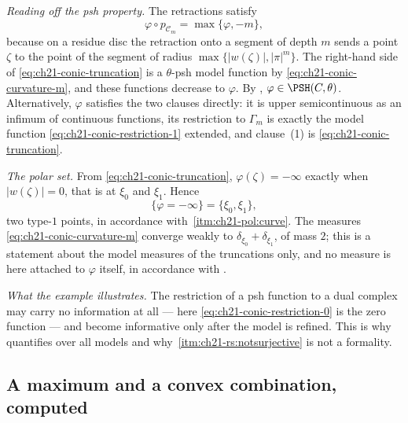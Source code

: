 \begin{example}
\emph{Reading off the psh property.}  The retractions satisfy
\begin{equation}
\label{eq:ch21-conic-truncation}
 \varphi\circ p_{\mathcal C_m}=\max\{\varphi,-m\},
\end{equation}
because on a residue disc the retraction onto a segment of depth \(m\) sends
a point \(\zeta\) to the point of the segment of radius
\(\max\{|w(\zeta)|,|\pi|^m\}\).  The right-hand side of
\eqref{eq:ch21-conic-truncation} is a \(\theta\)-psh model function by
\eqref{eq:ch21-conic-curvature-m}, and these functions decrease to
\(\varphi\).  By ,
\(\varphi\in\PSH(C,\theta)\).  Alternatively, \(\varphi\) satisfies the two
clauses directly: it is upper semicontinuous as an infimum of continuous
functions, its restriction to \(\Gamma_m\) is exactly the model function
\eqref{eq:ch21-conic-restriction-1} extended, and clause~(1) is
\eqref{eq:ch21-conic-truncation}.

\emph{The polar set.}  From \eqref{eq:ch21-conic-truncation},
\(\varphi(\zeta)=-\infty\) exactly when \(|w(\zeta)|=0\), that is at
\(\xi_0\) and \(\xi_1\).  Hence
\[
 \{\varphi=-\infty\}=\{\xi_0,\xi_1\},
\]
two type-\(1\) points, in accordance with
\,\cref{itm:ch21-pol:curve}.  The measures
\eqref{eq:ch21-conic-curvature-m} converge weakly to
\(\delta_{\xi_0}+\delta_{\xi_1}\), of mass \(2\); this is a statement about
the model measures of the truncations only, and no measure is here attached
to \(\varphi\) itself, in accordance with .

\emph{What the example illustrates.}  The restriction of a psh function to
a dual complex may carry no information at all --- here
\eqref{eq:ch21-conic-restriction-0} is the zero function --- and become
informative only after the model is refined.  This is why
 quantifies over all models and why
\,\cref{itm:ch21-rs:notsurjective} is not
a formality.
\end{example}

\subsection{A maximum and a convex combination, computed}
\label{sec:ch21-worked-max}

